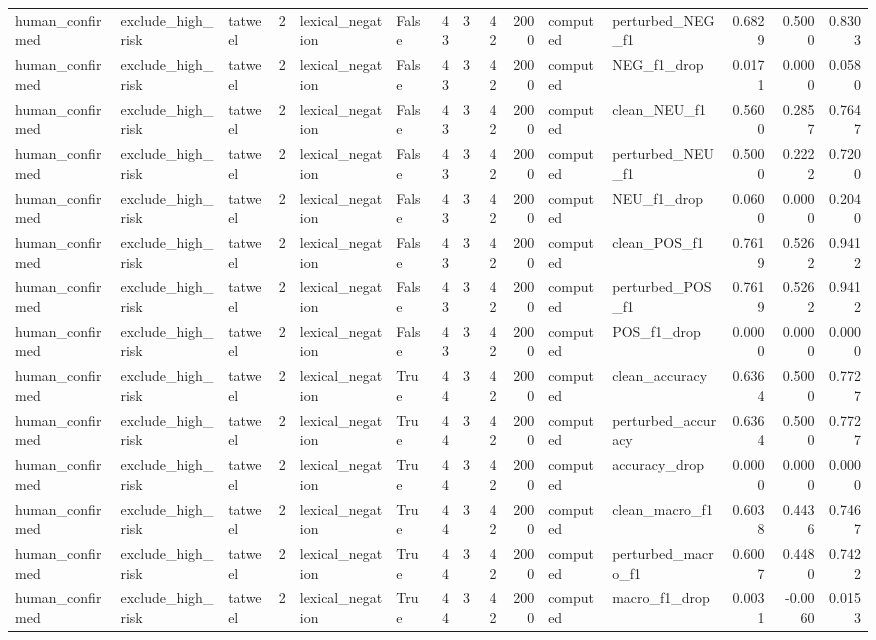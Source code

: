 \begin{tabular}{lllrllrrrrllrrr}
human_confirmed & exclude_high_risk & tatweel & 2 & lexical_negation & False & 43 & 3 & 42 & 2000 & computed & perturbed_NEG_f1 & 0.6829 & 0.5000 & 0.8303 \\
human_confirmed & exclude_high_risk & tatweel & 2 & lexical_negation & False & 43 & 3 & 42 & 2000 & computed & NEG_f1_drop & 0.0171 & 0.0000 & 0.0580 \\
human_confirmed & exclude_high_risk & tatweel & 2 & lexical_negation & False & 43 & 3 & 42 & 2000 & computed & clean_NEU_f1 & 0.5600 & 0.2857 & 0.7647 \\
human_confirmed & exclude_high_risk & tatweel & 2 & lexical_negation & False & 43 & 3 & 42 & 2000 & computed & perturbed_NEU_f1 & 0.5000 & 0.2222 & 0.7200 \\
human_confirmed & exclude_high_risk & tatweel & 2 & lexical_negation & False & 43 & 3 & 42 & 2000 & computed & NEU_f1_drop & 0.0600 & 0.0000 & 0.2040 \\
human_confirmed & exclude_high_risk & tatweel & 2 & lexical_negation & False & 43 & 3 & 42 & 2000 & computed & clean_POS_f1 & 0.7619 & 0.5262 & 0.9412 \\
human_confirmed & exclude_high_risk & tatweel & 2 & lexical_negation & False & 43 & 3 & 42 & 2000 & computed & perturbed_POS_f1 & 0.7619 & 0.5262 & 0.9412 \\
human_confirmed & exclude_high_risk & tatweel & 2 & lexical_negation & False & 43 & 3 & 42 & 2000 & computed & POS_f1_drop & 0.0000 & 0.0000 & 0.0000 \\
human_confirmed & exclude_high_risk & tatweel & 2 & lexical_negation & True & 44 & 3 & 42 & 2000 & computed & clean_accuracy & 0.6364 & 0.5000 & 0.7727 \\
human_confirmed & exclude_high_risk & tatweel & 2 & lexical_negation & True & 44 & 3 & 42 & 2000 & computed & perturbed_accuracy & 0.6364 & 0.5000 & 0.7727 \\
human_confirmed & exclude_high_risk & tatweel & 2 & lexical_negation & True & 44 & 3 & 42 & 2000 & computed & accuracy_drop & 0.0000 & 0.0000 & 0.0000 \\
human_confirmed & exclude_high_risk & tatweel & 2 & lexical_negation & True & 44 & 3 & 42 & 2000 & computed & clean_macro_f1 & 0.6038 & 0.4436 & 0.7467 \\
human_confirmed & exclude_high_risk & tatweel & 2 & lexical_negation & True & 44 & 3 & 42 & 2000 & computed & perturbed_macro_f1 & 0.6007 & 0.4480 & 0.7422 \\
human_confirmed & exclude_high_risk & tatweel & 2 & lexical_negation & True & 44 & 3 & 42 & 2000 & computed & macro_f1_drop & 0.0031 & -0.0060 & 0.0153 \\

\end{tabular}
